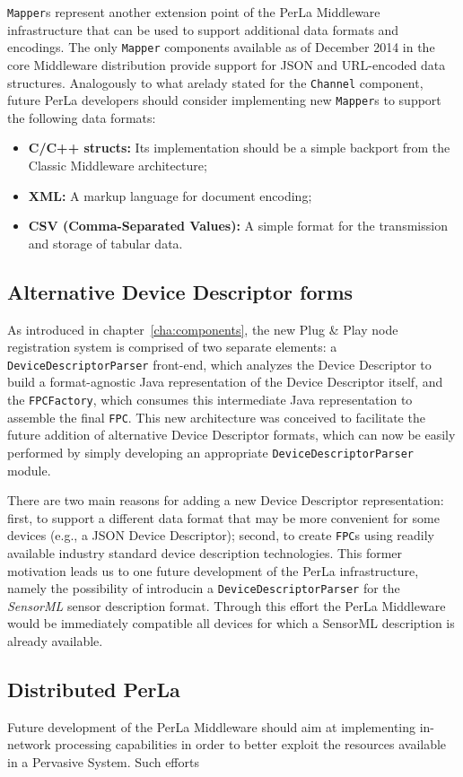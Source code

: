 \texttt{Mapper}s represent another extension point of the PerLa Middleware
infrastructure that can be used to support additional data formats and
encodings. The only \texttt{Mapper} components available as of December 2014
in the core Middleware distribution provide support for JSON and URL-encoded
data structures. Analogously to what arelady stated for the \texttt{Channel}
component, future PerLa developers should consider implementing new
\texttt{Mapper}s to support the following data formats:

\begin{itemize}

    \item \textbf{C/C++ structs:} Its implementation should be a simple
    backport from the Classic Middleware architecture;

    \item \textbf{XML:} A markup language for document encoding;

    \item \textbf{CSV (Comma-Separated Values):} A simple format for the
    transmission and storage of tabular data.

\end{itemize}

\subsection{Alternative Device Descriptor forms}

As introduced in chapter~\ref{cha:components}, the new Plug \& Play node
registration system is comprised of two separate elements: a
\texttt{DeviceDescriptorParser} front-end, which analyzes the Device Descriptor
to build a format-agnostic Java representation of the Device Descriptor itself,
and the \texttt{FPCFactory}, which consumes this intermediate Java
representation to assemble the final \texttt{FPC}. This new architecture was
conceived to facilitate the future addition of alternative Device Descriptor
formats, which can now be easily performed by simply developing an appropriate
\texttt{DeviceDescriptorParser} module.

There are two main reasons for adding a new Device Descriptor representation:
first, to support a different data format that may be more convenient for some
devices (e.g., a JSON Device Descriptor); second, to create \texttt{FPC}s using
readily available industry standard device description technologies. This
former motivation leads us to one future development of the PerLa
infrastructure, namely the possibility of introducin a
\texttt{DeviceDescriptorParser} for the \textit{SensorML} \cite{sensorml}
sensor description format. Through this effort the PerLa Middleware would be
immediately compatible all devices for which a SensorML description is already
available.

\subsection{Distributed PerLa}

Future development of the PerLa Middleware should aim at implementing
in-network processing capabilities in order to better exploit the resources
available in a Pervasive System. Such efforts 
